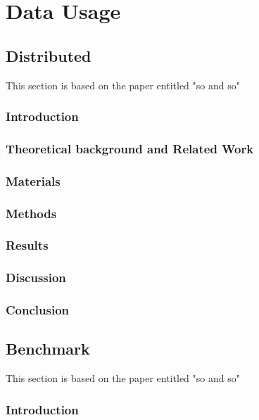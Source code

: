 \section{Data Usage} \label{sec:datausage}



\subsection{Distributed}\label{subsec:distributed}
This section is based on the paper entitled "so and so"

\subsubsection{Introduction}

\subsubsection{Theoretical background and Related Work}

\subsubsection{Materials}

\subsubsection{Methods}

\subsubsection{Results}

\subsubsection{Discussion}

\subsubsection{Conclusion}



\subsection{Benchmark}\label{subsec:benchmark}
This section is based on the paper entitled "so and so"

\subsubsection{Introduction}

